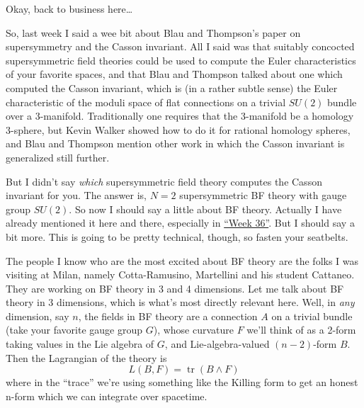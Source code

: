 \documentclass{article}
\renewcommand{\texttt}[1]{%
  \begingroup
  \ttfamily
  \begingroup\lccode`~=`/\lowercase{\endgroup\def~}{/\discretionary{}{}{}}%
  \begingroup\lccode`~=`[\lowercase{\endgroup\def~}{[\discretionary{}{}{}}%
  \begingroup\lccode`~=`.\lowercase{\endgroup\def~}{.\discretionary{}{}{}}%
  \catcode`/=\active\catcode`[=\active\catcode`.=\active
  \scantokens{#1\noexpand}%
  \endgroup
}
\begin{document}
Okay, back to business here\ldots{}


So, last week I said a wee bit about Blau and Thompson's paper on
supersymmetry and the Casson invariant. All I said was that suitably
concocted supersymmetric field theories could be used to compute the
Euler characteristics of your favorite spaces, and that Blau and
Thompson talked about one which computed the Casson invariant, which is
(in a rather subtle sense) the Euler characteristic of the moduli space
of flat connections on a trivial \(SU(2)\) bundle over a 3-manifold.
Traditionally one requires that the 3-manifold be a homology 3-sphere,
but Kevin Walker showed how to do it for rational homology spheres, and
Blau and Thompson mention other work in which the Casson invariant is
generalized still further.

But I didn't say \emph{which} supersymmetric field theory computes the
Casson invariant for you. The answer is, \(N = 2\) supersymmetric BF
theory with gauge group \(SU(2)\). So now I should say a little about BF
theory. Actually I have already mentioned it here and there, especially
in \protect\hyperlink{week36}{``Week 36''}. But I should say a bit more.
This is going to be pretty technical, though, so fasten your seatbelts.

The people I know who are the most excited about BF theory are the folks
I was visiting at Milan, namely Cotta-Ramusino, Martellini and his
student Cattaneo. They are working on BF theory in 3 and 4 dimensions.
Let me talk about BF theory in 3 dimensions, which is what's most
directly relevant here. Well, in \emph{any} dimension, say \(n\), the
fields in BF theory are a connection \(A\) on a trivial bundle (take
your favorite gauge group \(G\)), whose curvature \(F\) we'll think of
as a 2-form taking values in the Lie algebra of \(G\), and
Lie-algebra-valued \((n-2)\)-form \(B\). Then the Lagrangian of the
theory is \[L(B,F) = \operatorname{tr}(B \wedge F)\] where in the
``trace'' we're using something like the Killing form to get an honest
n-form which we can integrate over spacetime.
\end{document}
